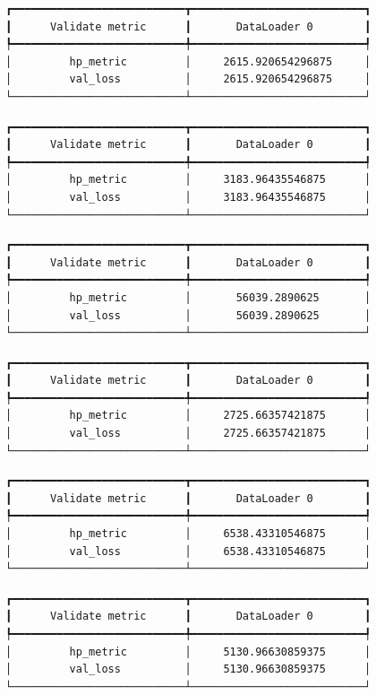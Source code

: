 \documentclass[
  letterpaper,
  DIV=11,
  numbers=noendperiod]{scrreprt}
\begin{document}
\begin{verbatim}
┏━━━━━━━━━━━━━━━━━━━━━━━━━━━┳━━━━━━━━━━━━━━━━━━━━━━━━━━━┓
┃      Validate metric      ┃       DataLoader 0        ┃
┡━━━━━━━━━━━━━━━━━━━━━━━━━━━╇━━━━━━━━━━━━━━━━━━━━━━━━━━━┩
│         hp_metric         │     2615.920654296875     │
│         val_loss          │     2615.920654296875     │
└───────────────────────────┴───────────────────────────┘
\end{verbatim}

\begin{verbatim}
┏━━━━━━━━━━━━━━━━━━━━━━━━━━━┳━━━━━━━━━━━━━━━━━━━━━━━━━━━┓
┃      Validate metric      ┃       DataLoader 0        ┃
┡━━━━━━━━━━━━━━━━━━━━━━━━━━━╇━━━━━━━━━━━━━━━━━━━━━━━━━━━┩
│         hp_metric         │     3183.96435546875      │
│         val_loss          │     3183.96435546875      │
└───────────────────────────┴───────────────────────────┘
\end{verbatim}

\begin{verbatim}
┏━━━━━━━━━━━━━━━━━━━━━━━━━━━┳━━━━━━━━━━━━━━━━━━━━━━━━━━━┓
┃      Validate metric      ┃       DataLoader 0        ┃
┡━━━━━━━━━━━━━━━━━━━━━━━━━━━╇━━━━━━━━━━━━━━━━━━━━━━━━━━━┩
│         hp_metric         │       56039.2890625       │
│         val_loss          │       56039.2890625       │
└───────────────────────────┴───────────────────────────┘
\end{verbatim}

\begin{verbatim}
┏━━━━━━━━━━━━━━━━━━━━━━━━━━━┳━━━━━━━━━━━━━━━━━━━━━━━━━━━┓
┃      Validate metric      ┃       DataLoader 0        ┃
┡━━━━━━━━━━━━━━━━━━━━━━━━━━━╇━━━━━━━━━━━━━━━━━━━━━━━━━━━┩
│         hp_metric         │     2725.66357421875      │
│         val_loss          │     2725.66357421875      │
└───────────────────────────┴───────────────────────────┘
\end{verbatim}

\begin{verbatim}
┏━━━━━━━━━━━━━━━━━━━━━━━━━━━┳━━━━━━━━━━━━━━━━━━━━━━━━━━━┓
┃      Validate metric      ┃       DataLoader 0        ┃
┡━━━━━━━━━━━━━━━━━━━━━━━━━━━╇━━━━━━━━━━━━━━━━━━━━━━━━━━━┩
│         hp_metric         │     6538.43310546875      │
│         val_loss          │     6538.43310546875      │
└───────────────────────────┴───────────────────────────┘
\end{verbatim}

\begin{verbatim}
┏━━━━━━━━━━━━━━━━━━━━━━━━━━━┳━━━━━━━━━━━━━━━━━━━━━━━━━━━┓
┃      Validate metric      ┃       DataLoader 0        ┃
┡━━━━━━━━━━━━━━━━━━━━━━━━━━━╇━━━━━━━━━━━━━━━━━━━━━━━━━━━┩
│         hp_metric         │     5130.96630859375      │
│         val_loss          │     5130.96630859375      │
└───────────────────────────┴───────────────────────────┘
\end{verbatim}
\end{document}
